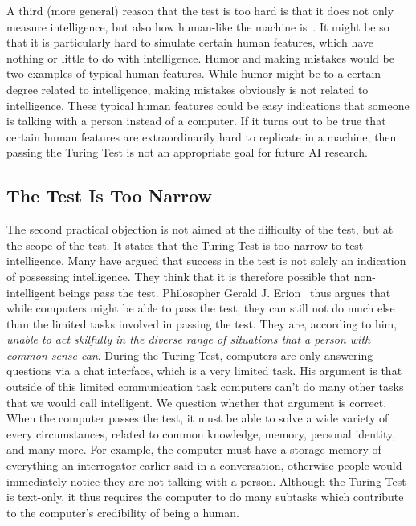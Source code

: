 A third (more general) reason that the test is too hard is that it does not only measure intelligence, but also how human-like the machine is~\cite{sep-turing-test}. It might be so that it is particularly hard to simulate certain human features, which have nothing or little to do with intelligence. Humor and making mistakes would be two examples of typical human features. While humor might be to a certain degree related to intelligence, making mistakes obviously is not related to intelligence. These typical human features could be easy indications that someone is talking with a person instead of a computer. If it turns out to be true that certain human features are extraordinarily hard to replicate in a machine, then passing the Turing Test is not an appropriate goal for future AI research.


\subsection{The Test Is Too Narrow}
The second practical objection is not aimed at the difficulty of the test, but at the scope of the test. It states that the Turing Test is too narrow to test intelligence. Many have argued that success in the test is not solely an indication of possessing intelligence. They think that it is therefore possible that non-intelligent beings pass the test. Philosopher Gerald J. Erion~\cite{erion2001cartesian} thus argues that while computers might be able to pass the test, they can still not do much else than the limited tasks involved in passing the test. They are, according to him, \textit{unable to act skilfully in the diverse range of situations that a person with common sense can}. During the Turing Test, computers are only answering questions via a chat interface, which is a very limited task. His argument is that outside of this limited communication task computers can't do many other tasks that we would call intelligent. We question whether that argument is correct. When the computer passes the test, it must be able to solve a wide variety of every circumstances, related to common knowledge, memory, personal identity, and many more. For example, the computer must have a storage memory of everything an interrogator earlier said in a conversation, otherwise people would immediately notice they are not talking with a person. Although the Turing Test is text-only, it thus requires the computer to do many subtasks which contribute to the computer's credibility of being a human.

